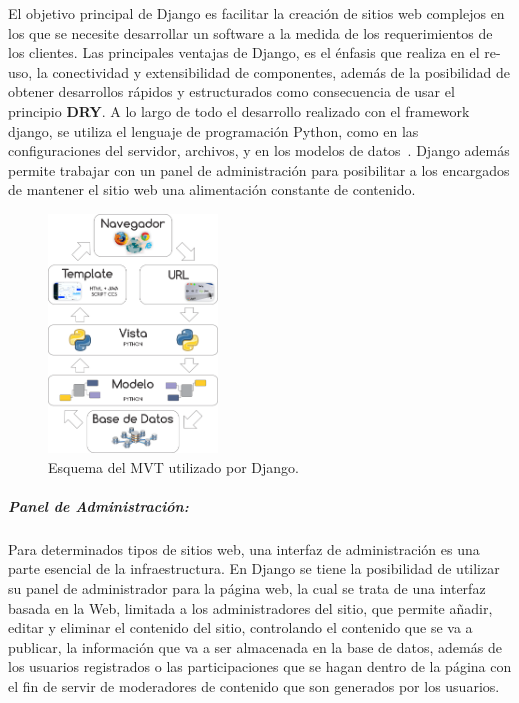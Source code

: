 \documentclass[a4paper]{article}
\begin{document}
El objetivo principal de Django es facilitar la creación de sitios web complejos en los que se necesite desarrollar un software a la medida de los requerimientos de los clientes. Las principales ventajas de Django, es el énfasis que realiza en el re-uso, la conectividad y extensibilidad de componentes, además de la posibilidad de obtener desarrollos rápidos y estructurados como consecuencia de usar el principio \textbf{DRY}. A lo largo de todo el desarrollo realizado con el framework django, se utiliza el lenguaje de programación Python, como en las configuraciones del servidor, archivos, y en los modelos de datos~\citep{Wik2014}. Django además permite trabajar con un panel de administración para posibilitar a los encargados de mantener el sitio web una alimentación constante de contenido.

\begin{figure}[t]
\centering
\includegraphics[width=0.4\textwidth]{diagrama_MVC.png}
\caption{Esquema del MVT utilizado por Django.}
\label{fig:esq_Django}
\end{figure}

\subparagraph*{Panel de Administración:}

Para determinados tipos de sitios web, una interfaz de administración es una parte esencial de la infraestructura. En Django se tiene la posibilidad de utilizar su panel de administrador para la página web, la cual se trata de una interfaz basada en la Web, limitada a los administradores del sitio, que permite añadir, editar y eliminar el contenido del sitio, controlando el contenido que se va a publicar, la información que va a ser almacenada en la base de datos, además de los usuarios registrados o las participaciones que se hagan dentro de la página con el fin de servir de moderadores de contenido que son generados por los usuarios. 
\end{document}
